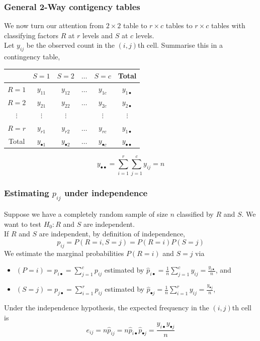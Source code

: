 \documentclass[a4paper]{article}
\begin{document}
\subsubsection{General 2-Way contigency tables}
We now turn our attention from \( 2 \times 2 \) table to \( r \times c \) tables to \( r \times c \) tables with classifying factors \( R \) at \( r \) levels and \( S \) at \( c \) levels.\\
Let \( y_{ij} \) be the observed count in the \( (i,j) \)th cell. 
Summarise this in a contingency table,
\begin{table}[H]
	\centering
	\begin{tabular}{@{}ccccc|c@{}}
	\toprule
				 & \( S = 1 \)   		& \( S = 2 \)   	  & \( \dots \) & \( S = c \)  		  & Total		             \\ \midrule
	\( R = 1 \)  & \( y_{11} \) 		& \( y_{12} \) 		  & \( \dots \) & \( y_{1c} \)        & \( y_{1 \bullet} \)      \\
	\( R = 2 \)  & \( y_{21} \) 		& \( y_{22} \) 		  & \( \dots \) & \( y_{2c} \)        & \( y_{2 \bullet} \)      \\ 
	\( \vdots \) & \( \vdots \) 		& \( \vdots \) 		  &             & \( \vdots \)        & \( \vdots \) 	         \\ 
	\( R = r \)  & \( y_{r1} \) 		& \( y_{r2} \) 		  & \( \dots \) & \( y_{rc} \)        & \( y_{1 \bullet} \)      \\ \midrule
	Total 		 & \( y_{\bullet 1} \)  & \( y_{\bullet 2} \) & \( \dots \) & \( y_{\bullet c} \) & \( y_{\bullet\bullet} \) \\ \bottomrule
	\end{tabular}
\end{table}
\[
	y_{\bullet\bullet} = \sum_{i=1}^{r} \sum_{j=1}^{c} y_{ij} = n
\]
\subsubsection{Estimating \( p_{ij} \) under independence}
Suppose we have a completely random sample of size \( n \) classified by \( R \) and \( S \). We want to test \( H_0: R \) and \( S \) are independent.\\
If \( R \) and \( S \) are independent, by definition of independence,
\[
	p_{ij} = P(R = i, S = j) = P(R = i)P(S = j)
\]
We estimate the marginal probabilities \( P(R = i) \) and \( S = j \) via
\begin{itemize}
	\item \( (P = i) = p_{i \bullet} = \sum\limits_{j=1}^{c} p_{ij} \) estimated by \( \hat{p}_{i \bullet} = \frac{1}{n}\sum\limits_{j=1}^{c} y_{ij} = \frac{y_{i \bullet}}{n} \), and 
	\item \( (S = j) = p_{j \bullet} = \sum\limits_{i=1}^{r} p_{ij} \) estimated by \( \hat{p}_{\bullet j} = \frac{1}{n}\sum\limits_{i=1}^{r} y_{ij} = \frac{y_{\bullet j}}{n} \),
\end{itemize}
Under the independence hypothesis, the expected frequency in the  \( (i,j) \)th cell is
\[
	e_{ij} = n \hat{p}_{ij} = n \hat{p}_{i \bullet}\hat{p}_{\bullet j} = \frac{y_{i \bullet}y_{\bullet j}}{n}
\]
\end{document}
